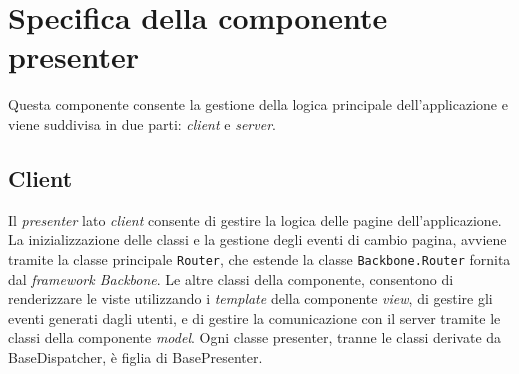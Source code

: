 \section{Specifica della componente presenter}
Questa componente consente la gestione della logica principale dell'applicazione \progetto{} e viene suddivisa in due parti: \textit{client} e \textit{server}.

\subsection{Client}

Il \textit{presenter} lato \textit{client} consente di gestire la logica delle pagine dell'applicazione.
La inizializzazione delle classi e la gestione degli eventi di cambio pagina, avviene tramite la classe principale \texttt{Router}, che estende la classe \texttt{Backbone.Router} fornita dal \textit{framework Backbone}.
Le altre classi della componente, consentono di renderizzare le viste utilizzando i \textit{template} della componente \textit{view}, di gestire gli eventi generati dagli utenti, e di gestire la comunicazione con il server tramite le classi della componente \textit{model}.
Ogni classe presenter, tranne le classi derivate da BaseDispatcher, è figlia di BasePresenter.

